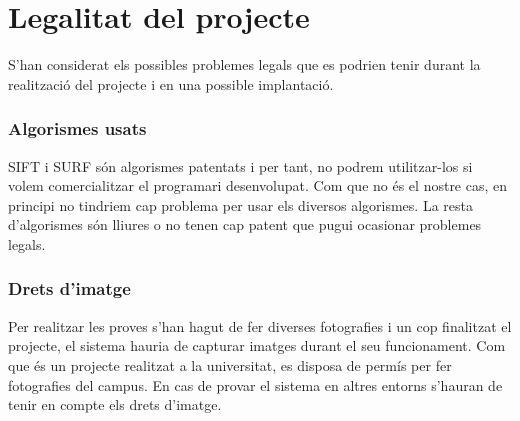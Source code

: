 \section{Legalitat del projecte}

	S'han considerat els possibles problemes legals que es podrien tenir durant la realització del projecte i en una possible implantació.

	\subsubsection{Algorismes usats}
		SIFT i SURF són algorismes patentats i per tant, no podrem utilitzar-los si volem comercialitzar el programari desenvolupat. Com que no és el nostre cas, en principi no tindriem cap problema per usar
		els diversos algorismes. La resta d'algorismes són lliures o no tenen cap patent que pugui ocasionar problemes legals.
	
	\subsubsection{Drets d'imatge}
		Per realitzar les proves s'han hagut de fer diverses fotografies i un cop finalitzat el projecte, el sistema hauria de capturar imatges durant el seu funcionament.
		Com que és un projecte realitzat a la universitat, es disposa de permís per fer fotografies del campus. En cas de provar el sistema en altres entorns s'hauran de tenir en compte els drets d'imatge.
